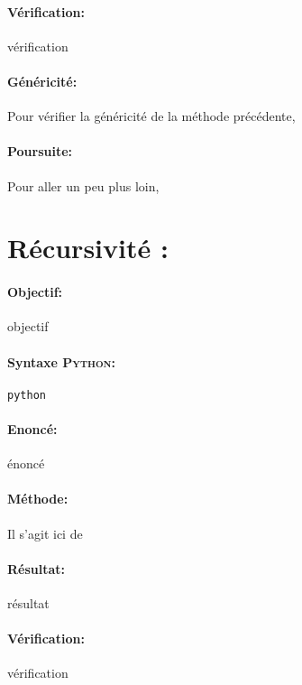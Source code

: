 \documentclass[11pt,a4paper,colorlinks,breaklinks]{article}
\def\python{\textsc{Python}}
\begin{document}
\paragraph{Vérification:} vérification

\paragraph{Généricité:} Pour vérifier la généricité de la méthode précédente,

\paragraph{Poursuite:} Pour aller un peu plus loin,


\newpage
\section{Récursivité : }\label{maths:recursivite}
\paragraph{Objectif:} objectif

\paragraph{Syntaxe \python:} \texttt{python}

\begin{framed}
\paragraph{Enoncé:} énoncé
\end{framed}

\paragraph{Méthode:} Il s'agit ici de 

\paragraph{Résultat:} résultat

\paragraph{Vérification:} vérification
\end{document}
